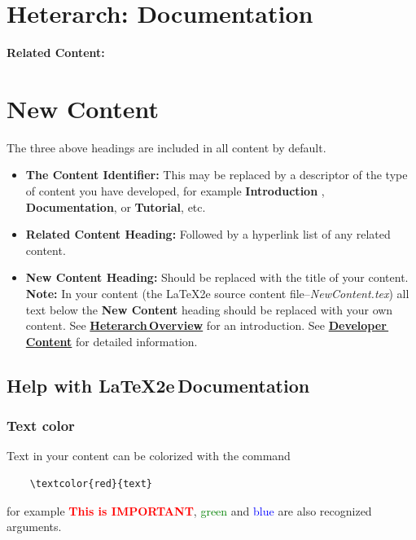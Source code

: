 \documentclass[12pt]{article}
\newcommand{\heterarchxref}[2]{\href{#1}{#2}}
\begin{document}
\section*{Heterarch: Documentation}

{\bf Related Content:}

\section*{New Content}

The three above headings are included in all content by default.

\begin{itemize}
\item[]  {\bf The Content Identifier:} This may be replaced by a descriptor of the type of content you have developed, for example {\bf Introduction} , {\bf Documentation}, or {\bf Tutorial}, etc.
\item[]{\bf Related Content Heading:} Followed by a hyperlink list of any related content.
\item[] {\bf New Content Heading:} Should be replaced with the title of your content. {\bf Note:} In your content (the \LaTeX2e\,\,source content file--{\it NewContent.tex}) all text below the {\bf New Content} heading should be replaced with your own content. See \heterarchxref{../../../../../heterarch/source/snapshots/0/heterarch-overview/heterarch-overview.tex}{\bf Heterarch\,Overview} for an introduction. See \heterarchxref{../../../../../heterarch/source/snapshots/0/heterarch-developer-content/heterarch-developer-content.tex}{\bf Developer\,Content} for detailed information.
\end{itemize}

\subsection*{Help with \LaTeX2e\,Documentation}

\subsubsection*{Text color}

Text in your content can be colorized  with the command
\begin{verbatim}
    \textcolor{red}{text}
\end{verbatim}
for example \textcolor{red}{\bf This is IMPORTANT}, \textcolor{green}{green} and \textcolor{blue}{blue} are also recognized arguments.
\end{document}
